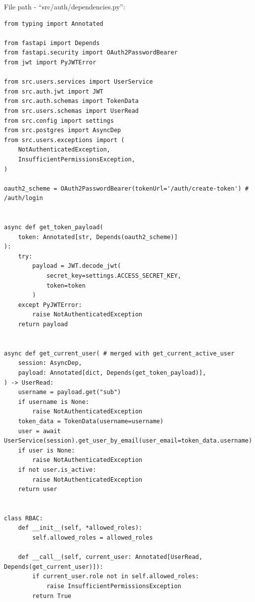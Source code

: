 File path - ``src/auth/dependencies.py'':
\begin{lstlisting}
from typing import Annotated

from fastapi import Depends
from fastapi.security import OAuth2PasswordBearer
from jwt import PyJWTError

from src.users.services import UserService
from src.auth.jwt import JWT
from src.auth.schemas import TokenData
from src.users.schemas import UserRead
from src.config import settings
from src.postgres import AsyncDep
from src.users.exceptions import (
    NotAuthenticatedException,
    InsufficientPermissionsException,
)

oauth2_scheme = OAuth2PasswordBearer(tokenUrl='/auth/create-token') # /auth/login


async def get_token_payload(
    token: Annotated[str, Depends(oauth2_scheme)]
):
    try:
        payload = JWT.decode_jwt(
            secret_key=settings.ACCESS_SECRET_KEY,
            token=token
        )
    except PyJWTError:
        raise NotAuthenticatedException
    return payload


async def get_current_user( # merged with get_current_active_user
    session: AsyncDep,
    payload: Annotated[dict, Depends(get_token_payload)],
) -> UserRead:
    username = payload.get("sub")
    if username is None: 
        raise NotAuthenticatedException
    token_data = TokenData(username=username)
    user = await UserService(session).get_user_by_email(user_email=token_data.username)
    if user is None:
        raise NotAuthenticatedException
    if not user.is_active:
        raise NotAuthenticatedException
    return user


class RBAC:
    def __init__(self, *allowed_roles):
        self.allowed_roles = allowed_roles
    
    def __call__(self, current_user: Annotated[UserRead, Depends(get_current_user)]):
        if current_user.role not in self.allowed_roles:
            raise InsufficientPermissionsException
        return True
\end{lstlisting}

\clearpage

